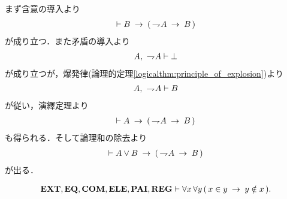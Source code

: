 	\begin{sketch}
		まず含意の導入より
		\begin{align}
			\vdash B \rarrow (\, \negation A \rarrow B\, )
		\end{align}
		が成り立つ．また矛盾の導入より
		\begin{align}
			A,\ \negation A \vdash \bot
		\end{align}
		が成り立つが，爆発律(論理的定理\ref{logicalthm:principle_of_explosion})より
		\begin{align}
			A,\ \negation A \vdash B
		\end{align}
		が従い，演繹定理より
		\begin{align}
			\vdash A \rarrow (\, \negation A \rarrow B\, )
		\end{align}
		も得られる．そして論理和の除去より
		\begin{align}
			\vdash A \vee B \rarrow (\, \negation A \rarrow B\, )
		\end{align}
		が出る．
		\QED
	\end{sketch}
	
	\begin{screen}
		\begin{thm}[集合のどの二組も所属関係で堂々巡りしない]
		\label{thm:no_pair_of_sets_go_round}
			\begin{align}
				\EXTAX,\EQAX,\COMAX,\ELEAX,\PAIAX,\REGAX \vdash 
				\forall x\, \forall y\, (\, x \in y \rarrow y \notin x\, ).
			\end{align}
		\end{thm}
	\end{screen}
	
